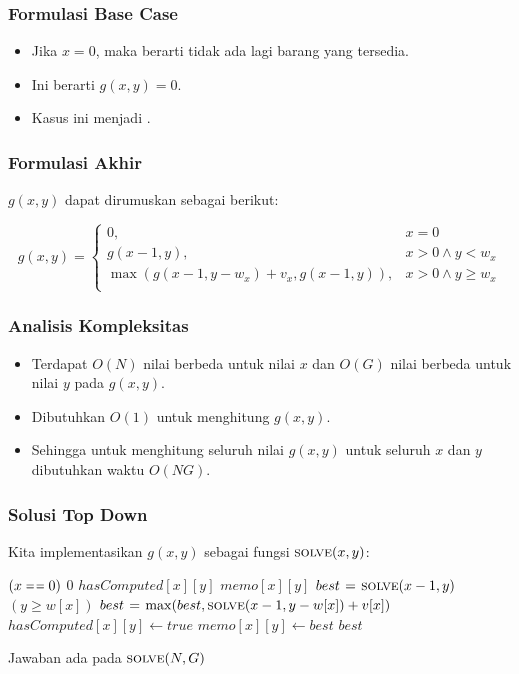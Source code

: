 \begin{frame} 
\frametitle{Formulasi Base Case}
\begin{itemize}
  \item Jika $x=0$, maka berarti tidak ada lagi barang yang tersedia. 
  \item Ini berarti $g(x,y) = 0$.
  \item Kasus ini menjadi \fbasecase.
\end{itemize}
\end{frame}

\begin{frame} 
\frametitle{Formulasi Akhir}
$g(x,y)$ dapat dirumuskan sebagai berikut:
\begin{small}
\[g(x,y) = \left\{\begin{array}{lr}
    0, & x = 0\\
    g(x-1,y), & x > 0 \wedge y < w_x\\
    \max(g(x-1,y-w_x)+v_x,g(x-1,y)), & x > 0 \wedge y \geq w_x\\
    \end{array}\right.\]
\end{small}
\end{frame}

\begin{frame} 
\frametitle{Analisis Kompleksitas}
\begin{itemize}
  \item Terdapat $O(N)$ nilai berbeda untuk nilai $x$ dan $O(G)$ nilai berbeda untuk nilai $y$ pada $g(x,y)$.
  \item Dibutuhkan $O(1)$ untuk menghitung $g(x,y)$. 
  \item Sehingga untuk menghitung seluruh nilai $g(x,y)$ untuk seluruh $x$ dan $y$ dibutuhkan waktu $O(NG)$.
\end{itemize}
\end{frame}

\begin{frame}
\frametitle{Solusi Top Down}
Kita implementasikan $g(x, y)$ sebagai fungsi $\textnormal{\scshape solve}(x,y)$:
\begin{codebox}
\li \If $(x \isequal 0)$ \Then
\li   \Return $0$
\li \ElseIf $hasComputed[x][y]$ \Then
\li   \Return $memo[x][y]$ 
\li \Else
\li   $best \mathrel{\hspace{1pt}=\hspace{1pt}} \textnormal{\scshape solve}(x-1, y)$
\li   \If $(y \geq w[x])$ \Then
\li     $best \mathrel{\hspace{1pt}=\hspace{1pt}} \max(best, \textnormal{\scshape solve}(x - 1, y-w[x]) + v[x])$
      \End  
\li   $hasComputed[x][y] \gets true$
\li   $memo[x][y] \gets best$
\li   \Return $best$
    \End
\end{codebox}

Jawaban ada pada $\textnormal{\scshape solve}(N, G)$
\end{frame}

